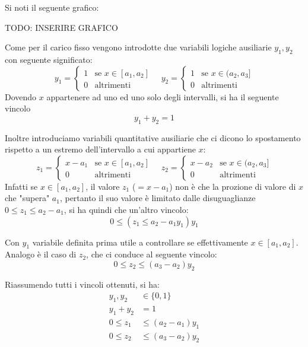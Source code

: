 Si noti il seguente grafico:

TODO: INSERIRE GRAFICO

Come per il carico fisso vengono introdotte due variabili logiche ausiliarie $ y_1, y_2 $ con seguente significato:
\begin{equation}
  y_1 = \begin{cases}
    1 & \text{se } x \in [a_1, a_2]\\
    0 & \text{altrimenti}
  \end{cases} \quad y_2 = \begin{cases}
    1 & \text{se } x \in (a_2, a_3]\\
    0 & \text{altrimenti}
  \end{cases}
\end{equation}
Dovendo $x$ appartenere ad uno ed uno solo degli intervalli, si ha il seguente vincolo
\[
  y_1 + y_2 = 1
\]


Inoltre introduciamo variabili quantitative ausiliarie che ci dicono lo spostamento rispetto a un estremo dell'intervallo a cui appartiene $x$:
\begin{equation}
  z_1 = \begin{cases}
    x - a_1 & \text{se } x \in [a_1, a_2]\\
    0 & \text{altrimenti}
  \end{cases} \quad z_2 = \begin{cases}
    x - a_2 & \text{se } x \in (a_2, a_3]\\
    0 & \text{altrimenti}
  \end{cases}
\end{equation}
Infatti se $x\in[a_1, a_2]$, il valore $z_1$ ($=x-a_1$) non è che la prozione di valore di $x$ che "supera" $a_1$, pertanto il suo valore è limitato dalle disuguaglianze $0\leq z_1 \leq a_2 - a_1$, si ha quindi che un'altro vincolo:
\[
  0\leq  (z_1 \leq a_2 - a_1 y_1)y_1
\]

Con $y_1$ variabile definita prima utile a controllare se effettivamente $x\in [a_1,a_2]$. Analogo è il caso di $z_2$, che ci conduce al seguente vincolo:
\[
  0\leq z_2 \leq (a_3 - a_2 )y_2
\]

Riassumendo tutti i vincoli ottenuti, si ha:
\begin{equation}
  \label{eq:vincoli_tratti}
  \begin{aligned}
    y_1,y_2 &\in \{0,1\}\\
    y_1 + y_2 &= 1\\
    0\leq z_1 &\leq (a_2 - a_1)y_1\\
    0\leq z_2 &\leq (a_3 - a_2)y_2
  \end{aligned}
\end{equation} 

